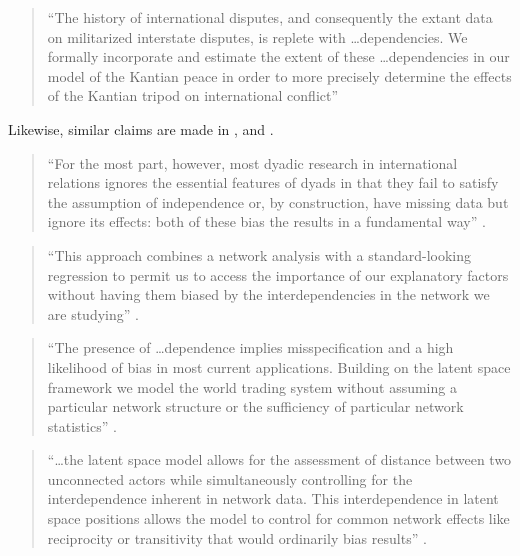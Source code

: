 \documentclass[11pt]{article}
\begin{document}
\begin{quote}
``The history of international disputes, and consequently the extant data on militarized interstate disputes, is replete with \ldots dependencies. We formally incorporate and estimate the extent of these \ldots dependencies in our model of the Kantian peace in order to more precisely determine the effects of the Kantian tripod on international conflict'' \citep[p. 585]{ward2007disputes}
\end{quote}

Likewise, similar claims are made in \citet{dorff2013networks, cao2013democracies, ward2013gravity, kirkland2012multimember}, and \citet{cao2016transnational}.

\begin{quote}
``For the most part, however, most dyadic research in international relations ignores the essential features of dyads in that they fail to satisfy the assumption of independence or, by construction, have missing data but ignore its effects: both of these bias the results in a fundamental way'' \citep[p. 2]{dorff2013networks}.
\end{quote}

\begin{quote}
``This approach combines a network analysis with a standard-looking regression to permit us to access the importance of our explanatory factors without having them biased by the interdependencies in the network we are studying'' \citep[p. 15]{cao2013democracies}.
\end{quote}

\begin{quote}
``The presence of \ldots dependence implies misspecification and a high likelihood of bias in most current applications. Building on the latent space framework we model the world trading system without assuming a particular network structure or the sufficiency of particular network statistics'' \citep[p. 20]{ward2013gravity}.
\end{quote}

\begin{quote}
``\ldots the latent space model allows for the assessment of distance between two unconnected actors while simultaneously controlling for the interdependence inherent in network data. This interdependence in latent space positions allows the model to control for common network effects like reciprocity or transitivity that would ordinarily bias results'' \citep[p. 336]{kirkland2012multimember}.
\end{quote}
\end{document}
